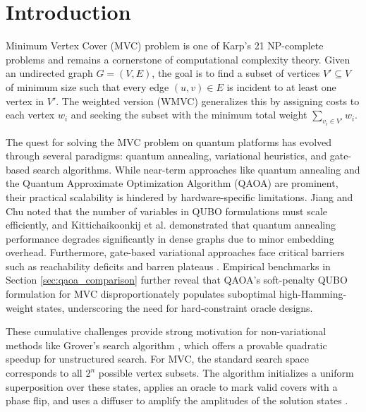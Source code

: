 \documentclass{ieeeaccess}
\begin{document}
\titlepgskip=-15pt

\maketitle

\section{Introduction}
\label{sec:introduction}

 Minimum Vertex Cover (MVC) problem is one of Karp's 21 NP-complete problems \cite{karp_reducibility_1972} and remains a cornerstone of computational complexity theory. Given an undirected graph $G=(V, E)$, the goal is to find a subset of vertices $V' \subseteq V$ of minimum size such that every edge $(u, v) \in E$ is incident to at least one vertex in $V'$. The weighted version (WMVC) generalizes this by assigning costs to each vertex $w_i$ and seeking the subset with the minimum total weight $\sum_{v_i \in V'} w_i$.

The quest for solving the MVC problem on quantum platforms has evolved through several paradigms: quantum annealing, variational heuristics, and gate-based search algorithms. While near-term approaches like quantum annealing and the Quantum Approximate Optimization Algorithm (QAOA) are prominent, their practical scalability is hindered by hardware-specific limitations. Jiang and Chu \cite{jiang_classifying_2023} noted that the number of variables in QUBO formulations must scale efficiently, and Kittichaikoonkij et al. \cite{kittichaikoonkij_benchmarking_nodate} demonstrated that quantum annealing performance degrades significantly in dense graphs due to minor embedding overhead. Furthermore, gate-based variational approaches face critical barriers such as reachability deficits \cite{akshay_reachability_2021} and barren plateaus \cite{larocca_barren_2025}. Empirical benchmarks in Section \ref{sec:qaoa_comparison} further reveal that QAOA's soft-penalty QUBO formulation for MVC disproportionately populates suboptimal high-Hamming-weight states, underscoring the need for hard-constraint oracle designs.

These cumulative challenges provide strong motivation for non-variational methods like Grover's search algorithm \cite{grover_fast_1996}, which offers a provable quadratic speedup for unstructured search. For MVC, the standard search space corresponds to all $2^n$ possible vertex subsets. The algorithm initializes a uniform superposition over these states, applies an oracle to mark valid covers with a phase flip, and uses a diffuser to amplify the amplitudes of the solution states \cite{boyer_tight_1998}. 
\end{document}

